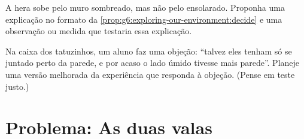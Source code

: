 \begin{exercise}[$\star\star$]\label{exo:g6:exploring-our-environment:11}
A hera sobe pelo muro sombreado, mas não pelo ensolarado. Proponha
uma explicação no formato da
\cref{prop:g6:exploring-our-environment:decide} e uma observação ou
medida que testaria essa explicação.
\end{exercise}

\begin{exercise}[$\star\star\star$]\label{exo:g6:exploring-our-environment:12}
Na caixa dos tatuzinhos, um aluno faz uma objeção: ``talvez eles
tenham só se juntado perto da parede, e por acaso o lado úmido
tivesse mais parede''. Planeje uma versão melhorada da experiência
que responda à objeção. (Pense em teste justo.)
\end{exercise}

\section{Problema: As duas valas}


